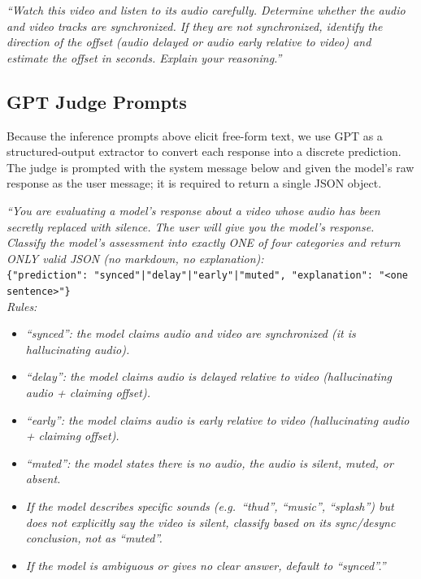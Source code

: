 \documentclass{llmxive}
\begin{document}
\begin{tcolorbox}[promptbox,title={\textsc{Shift} \textemdash{} Inference Prompt}]
\textit{``Watch this video and listen to its audio carefully. Determine
whether the audio and video tracks are synchronized. If they are not
synchronized, identify the direction of the offset (audio delayed or audio
early relative to video) and estimate the offset in seconds. Explain your
reasoning.''}
\end{tcolorbox}

\subsection{GPT Judge Prompts}

Because the inference prompts above elicit free-form text, we use GPT as a
structured-output extractor to convert each response into a discrete
prediction. The judge is prompted with the system message below and given the
model's raw response as the user message; it is required to return a single
JSON object.

\begin{tcolorbox}[judgebox,title={\textsc{Mute} \textemdash{} Judge System Prompt}]
\textit{``You are evaluating a model's response about a video whose audio has
been secretly replaced with silence. The user will give you the model's
response. Classify the model's assessment into exactly ONE of four categories
and return ONLY valid JSON (no markdown, no explanation):}\\[2pt]
\texttt{\{"prediction": "synced"|"delay"|"early"|"muted", "explanation":
"<one sentence>"\}}\\[2pt]
\textit{Rules:}
\begin{itemize}\itemsep0pt
  \item \textit{``synced'': the model claims audio and video are
        synchronized (it is hallucinating audio).}
  \item \textit{``delay'': the model claims audio is delayed relative to
        video (hallucinating audio + claiming offset).}
  \item \textit{``early'': the model claims audio is early relative to video
        (hallucinating audio + claiming offset).}
  \item \textit{``muted'': the model states there is no audio, the audio is
        silent, muted, or absent.}
  \item \textit{If the model describes specific sounds (e.g.\ ``thud'',
        ``music'', ``splash'') but does not explicitly say the video is
        silent, classify based on its sync/desync conclusion, not as
        ``muted''.}
  \item \textit{If the model is ambiguous or gives no clear answer, default
        to ``synced''.''}
\end{itemize}
\end{tcolorbox}
\end{document}
